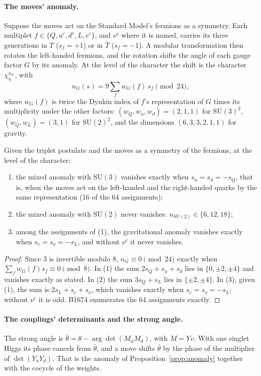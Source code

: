 \paragraph{The moves' anomaly.}
Suppose the moves act on the Standard Model's fermions as a symmetry. Each multiplet $f\in\{Q,u^c,d^c,L,e^c\}$, and
$\nu^c$ where it is named, carries its three generations in $T$ ($s_f=+1$) or in $\bar T$ ($s_f=-1$). A modular
transformation then rotates the left-handed fermions, and the rotation shifts the angle of each gauge factor $G$ by its
anomaly. At the level of the character the shift is the character $\chi_\eta^{n_G}$, with
\[
  n_G(s)=9\sum_f w_G(f)\,s_f\pmod{24},
\]
where $w_G(f)$ is twice the Dynkin index of $f$'s representation of $G$ times its multiplicity under the other factors:
$(w_Q,w_{u},w_{d})=(2,1,1)$ for $\mathrm{SU}(3)^2$, $(w_Q,w_L)=(3,1)$ for $\mathrm{SU}(2)^2$, and the dimensions
$(6,3,3,2,1,1)$ for gravity.

\begin{proposition}\label{prop:anomaly}
Given the triplet postulate and the moves as a symmetry of the fermions, at the level of the character:
\begin{enumerate}
\item the mixed anomaly with $\mathrm{SU}(3)$ vanishes exactly when $s_u=s_d=-s_Q$, that is, when the moves act on the
  left-handed and the right-handed quarks by the same representation (16 of the 64 assignments);
\item the mixed anomaly with $\mathrm{SU}(2)$ never vanishes: $n_{\mathrm{SU}(2)}\in\{6,12,18\}$;
\item among the assignments of (1), the gravitational anomaly vanishes exactly when $s_e=s_\nu=-s_L$, and without
  $\nu^c$ it never vanishes.
\end{enumerate}
\end{proposition}
\begin{proof}
Since $3$ is invertible modulo $8$, $n_G\equiv0\pmod{24}$ exactly when $\sum_f w_G(f)s_f\equiv0\pmod 8$. In (1) the sum
$2s_Q+s_u+s_d$ lies in $\{0,\pm2,\pm4\}$ and vanishes exactly as stated. In (2) the sum $3s_Q+s_L$ lies in
$\{\pm2,\pm4\}$. In (3), given (1), the sum is $2s_L+s_e+s_\nu$, which vanishes exactly when $s_e=s_\nu=-s_L$; without
$\nu^c$ it is odd. B1674 enumerates the 64 assignments exactly.
\end{proof}

\paragraph{The couplings' determinants and the strong angle.}
The strong angle is $\bar\theta=\theta-\arg\det(M_uM_d)$, with $M=Yv$. With one singlet Higgs its phase cancels from
$\bar\theta$, and a move shifts $\bar\theta$ by the phase of the multiplier of $\det(Y_uY_d)$. That is the anomaly of
Proposition~\ref{prop:anomaly} together with the cocycle of the weights.

